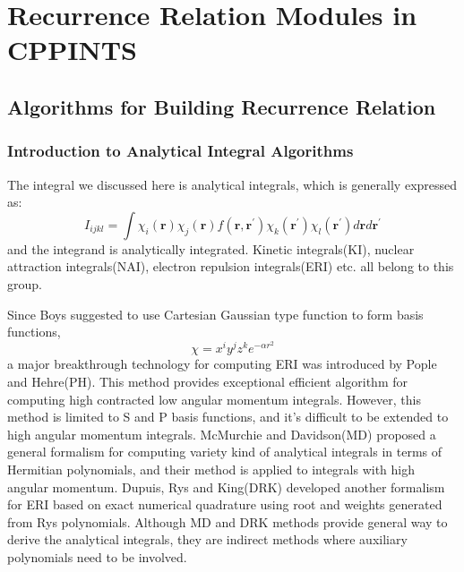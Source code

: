 %
% 
%
\chapter{Recurrence Relation Modules in CPPINTS}


\section{Algorithms for Building Recurrence Relation}

\subsection{Introduction to Analytical Integral Algorithms}
\label{concepts_introduction}

The integral we discussed here is analytical integrals,
which is generally expressed as:
\begin{equation}\label{int_paper:1}
  I_{ijkl} = \int \chi_{i}(\bm{r})\chi_{j}(\bm{r})f(\bm{r},\bm{r^{'}})
\chi_{k}(\bm{r^{'}})\chi_{l}(\bm{r^{'}}) d\bm{r} d\bm{r^{'}}
\end{equation}
and the integrand is analytically integrated. Kinetic integrals(KI),
nuclear attraction integrals(NAI), electron repulsion integrals(ERI) etc. all 
belong to this group. 

Since Boys\cite{SFBoys1950} suggested to use Cartesian Gaussian type function to form 
basis functions,
\begin{equation}\label{int_paper:2}
 \chi = x^{i}y^{j}z^{k}e^{-\alpha r^{2}}
\end{equation}
a major breakthrough technology for computing ERI was introduced by Pople and Hehre(PH)\cite{PH}. 
This method provides exceptional efficient algorithm for computing high contracted 
low angular momentum integrals. However, this method is limited to S and P basis functions, 
and it's difficult to be extended to high angular momentum integrals. McMurchie and 
Davidson(MD)\cite{MD}
proposed a general formalism for computing variety kind of analytical integrals in terms of 
Hermitian polynomials, and their method is applied to integrals with high angular momentum. 
Dupuis, Rys and King(DRK)\cite{DRK1976JCOMP,DRK1976JCP,DRK1983JCOMP} developed another formalism 
for ERI based on exact numerical 
quadrature using root and weights generated from Rys polynomials. Although MD and DRK
methods provide general way to derive the analytical integrals, they are indirect methods where
auxiliary polynomials need to be involved. 

